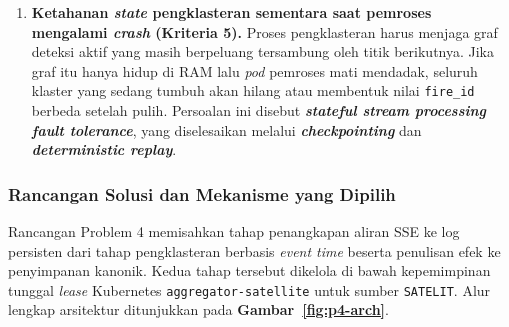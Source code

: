 \begin{enumerate}
  \item \textbf{Ketahanan \textit{state} pengklasteran sementara saat pemroses mengalami \textit{crash} (Kriteria 5).}
  Proses pengklasteran harus menjaga graf deteksi aktif yang masih berpeluang tersambung oleh titik berikutnya. Jika graf itu hanya hidup di RAM lalu \textit{pod} pemroses mati mendadak, seluruh klaster yang sedang tumbuh akan hilang atau membentuk nilai \texttt{fire\_id} berbeda setelah pulih. Persoalan ini disebut \textbf{\textit{stateful stream processing fault tolerance}}, yang diselesaikan melalui \textbf{\textit{checkpointing}} dan \textbf{\textit{deterministic replay}}.
\end{enumerate}

\subsubsection{Rancangan Solusi dan Mekanisme yang Dipilih}

Rancangan Problem 4 memisahkan tahap penangkapan aliran SSE ke log persisten dari tahap pengklasteran berbasis \textit{event time} beserta penulisan efek ke penyimpanan kanonik. Kedua tahap tersebut dikelola di bawah kepemimpinan tunggal \textit{lease} Kubernetes \texttt{aggregator-satellite} untuk sumber \texttt{SATELIT}. Alur lengkap arsitektur ditunjukkan pada \textbf{Gambar~\ref{fig:p4-arch}}.

